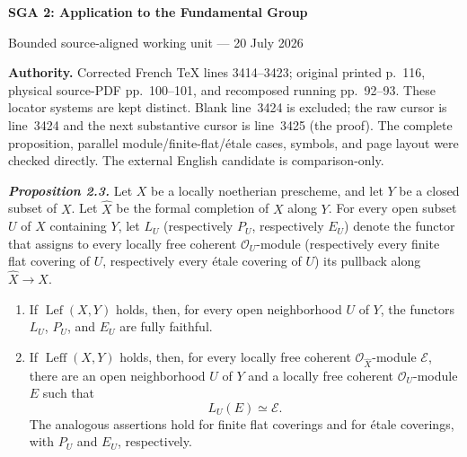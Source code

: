\documentclass[10pt,a4paper]{article}
\newcommand{\Lefc}{\operatorname{Lef}}
\newcommand{\Leffc}{\operatorname{Leff}}
\begin{document}
\begin{center}
  {\Large\bfseries SGA 2: Application to the Fundamental Group}\par\smallskip
  {\large Bounded source-aligned working unit --- 20 July 2026}
\end{center}
\noindent\colorbox{softgray}{\parbox{0.95\linewidth}{\footnotesize\textbf{Authority.}
Corrected French TeX lines 3414--3423; original printed p.~116, physical
source-PDF pp.~100--101, and recomposed running pp.~92--93. These locator
systems are kept distinct. Blank line~3424 is excluded; the raw cursor is
line~3424 and the next substantive cursor is line~3425 (the proof). The
complete proposition, parallel module/finite-flat/\'{e}tale cases, symbols,
and page layout were checked directly. The external English candidate is
comparison-only.}}

\medskip
\noindent\textbf{\textit{Proposition 2.3.}}
Let $X$ be a locally noetherian prescheme, and let $Y$ be a closed subset of
$X$. Let $\widehat X$ be the formal completion of $X$ along $Y$. For every
open subset $U$ of $X$ containing $Y$, let $L_U$ (respectively $P_U$,
respectively $E_U$) denote the functor that assigns to every locally free
coherent $\mathcal O_U$-module (respectively every finite flat covering of
$U$, respectively every \'{e}tale covering of $U$) its pullback along
$\widehat X\to X$.

\begin{enumerate}[label=(\roman*),leftmargin=2.5em]
\item If $\Lefc(X,Y)$ holds, then, for every open neighborhood $U$ of $Y$,
the functors $L_U$, $P_U$, and $E_U$ are fully faithful.

\item If $\Leffc(X,Y)$ holds, then, for every locally free coherent
$\mathcal O_{\widehat X}$-module $\mathcal E$, there are an open
neighborhood $U$ of $Y$ and a locally free coherent $\mathcal O_U$-module
$E$ such that
\[
  L_U(E)\simeq\mathcal E.
\]
The analogous assertions hold for finite flat coverings and for \'{e}tale
coverings, with $P_U$ and $E_U$, respectively.
\end{enumerate}
\end{document}
